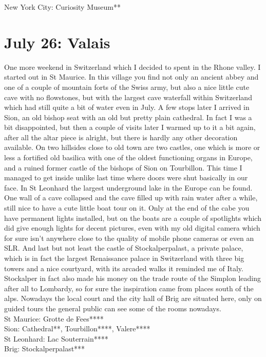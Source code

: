 New York City: Curiosity Museum**

\section{July 26: Valais}
\label{2009:Valais}

One more weekend in Switzerland which I decided to spent in the Rhone valley. I started out in St Maurice. In this village you find not only an ancient abbey and one of a couple of mountain forts of the Swiss army, but also a nice little cute cave with no flowstones, but with the largest cave waterfall within Switzerland which had still quite a bit of water even in July. A few stops later I arrived in Sion, an old bishop seat with an old but pretty plain cathedral. In fact I was a bit disappointed, but then a couple of visits later I warmed up to it a bit again, after all the altar piece is alright, but there is hardly any other decoration available. On two hillsides close to old town are two castles, one which is more or less a fortified old basilica with one of the oldest functioning organs in Europe, and a ruined former castle of the bishops of Sion on Tourbillon. This time I managed to get inside unlike last time where doors were shut basically in our face. In St Leonhard the largest underground lake in the Europe can be found. One wall of a cave collapsed and the cave filled up with rain water after a while, still nice to have a cute little boat tour on it. Only at the end of the cabe you have permanent lights installed, but on the boats are a couple of spotlights which did give enough lights for decent pictures, even with my old digital camera which for sure isn't anywhere close to the quality of mobile phone cameras or even an SLR. And last but not least the castle of Stockalperpalast, a private palace, which is in fact the largest Renaissance palace in Switzerland with three big towers and a nice courtyard, with its arcaded walks it reminded me of Italy. Stockalper in fact also made his money on the trade route of the Simplon leading after all to Lombardy, so for sure the inspiration came from places south of the alps. Nowadays the local court and the city hall of Brig are situated here, only on guided tours the general public can see some of the rooms nowadays.\\

St Maurice: Grotte de Fees****\\
Sion: Cathedral**, Tourbillon****, Valere****\\
 St Leonhard: Lac Souterrain****\\
Brig: Stockalperpalast***

